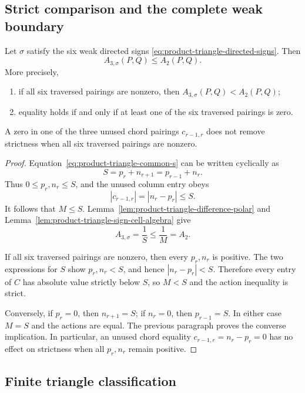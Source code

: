 \subsection{Strict comparison and the complete weak boundary}
\label{subsec:product-triangle-comparison}

\begin{unverified}
\begin{theorem}
\label{thm:product-triangle-wordwise-comparison}
Let \(\sigma\) satisfy the six weak directed signs
\eqref{eq:product-triangle-directed-signs}.  Then
\[
 A_{3,\sigma}(P,Q)\leq A_2(P,Q).
\]
More precisely,
\begin{enumerate}
  \item if all six traversed pairings are nonzero, then
  \(A_{3,\sigma}(P,Q)<A_2(P,Q)\);
  \item equality holds if and only if at least one of the six traversed
  pairings is zero.
\end{enumerate}
A zero in one of the three unused chord pairings \(c_{r-1,r}\) does not
remove strictness when all six traversed pairings are nonzero.
\end{theorem}

\begin{proof}
Equation~\eqref{eq:product-triangle-common-s} can be written cyclically as
\[
 S=p_r+n_{r+1}=p_{r-1}+n_r.
\]
Thus \(0\leq p_r,n_r\leq S\), and the unused column entry obeys
\[
 |c_{r-1,r}|=|n_r-p_r|\leq S.
\]
It follows that \(M\leq S\).  Lemma~\ref{lem:product-triangle-difference-polar}
and Lemma~\ref{lem:product-triangle-sign-cell-algebra} give
\[
 A_{3,\sigma}=\frac1S\leq\frac1M=A_2.
\]

If all six traversed pairings are nonzero, then every \(p_r,n_r\) is
positive.  The two expressions for \(S\) show \(p_r,n_r<S\), and hence
\(|n_r-p_r|<S\).  Therefore every entry of \(C\) has absolute value
strictly below \(S\), so \(M<S\) and the action inequality is strict.

Conversely, if \(p_r=0\), then \(n_{r+1}=S\); if \(n_r=0\), then
\(p_{r-1}=S\).  In either case \(M=S\) and the actions are equal.  The
previous paragraph proves the converse implication.  In particular, an
unused chord equality \(c_{r-1,r}=n_r-p_r=0\) has no effect on strictness
when all \(p_r,n_r\) remain positive.
\end{proof}
\end{unverified}

\subsection{Finite triangle classification}
\label{subsec:product-triangle-finite-classification}

